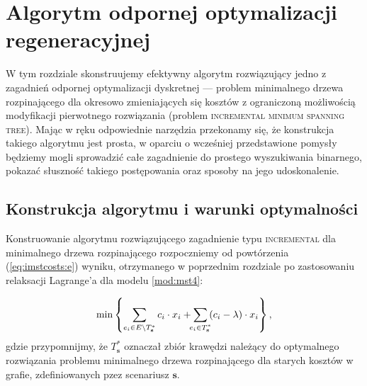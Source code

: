 \chapter{Algorytm odpornej optymalizacji regeneracyjnej}
\thispagestyle{chapterBeginStyle}
\label{ch:binaryIncMST}

W tym rozdziale skonstruujemy efektywny algorytm rozwiązujący jedno z zagadnień odpornej optymalizacji dyskretnej --- problem minimalnego drzewa rozpinającego dla okresowo zmieniających się kosztów z ograniczoną możliwością modyfikacji pierwotnego rozwiązania (problem \textsc{incremental minimum spanning tree}). Mając w ręku odpowiednie narzędzia przekonamy się, że konstrukcja takiego algorytmu jest prosta, w oparciu o wcześniej przedstawione pomysły będziemy mogli sprowadzić całe zagadnienie do prostego wyszukiwania binarnego, pokazać słuszność takiego postępowania oraz sposoby na jego udoskonalenie.

\section{Konstrukcja algorytmu i warunki optymalności}

Konstruowanie algorytmu rozwiązującego zagadnienie typu \textsc{incremental} dla minimalnego drzewa rozpinającego rozpoczniemy od powtórzenia (\ref{eq:imstcosts:e}) wyniku, otrzymanego w poprzednim rozdziale po zastosowaniu relaksacji Lagrange'a dla modelu \ref{mod:mst4}:

\begin{eqnarray}\label{eq:imstcosts2}
	\min \left\{ \sum_{e_{i} \in E \setminus T^{\ast}_{\textbf{s}}} c_{i} \cdot x_{i} + \sum_{\mathclap{e_{i} \in T^{\ast}_{\textbf{s}}}} \left( c_{i} - \lambda \right) \cdot x_{i} \right\}\text{,}
\end{eqnarray}
gdzie przypomnijmy, że $T^{\ast}_{\textbf{s}}$ oznaczał zbiór krawędzi należący do optymalnego rozwiązania problemu minimalnego drzewa rozpinającego dla starych kosztów w grafie, zdefiniowanych pzez scenariusz $\textbf{s}$.


